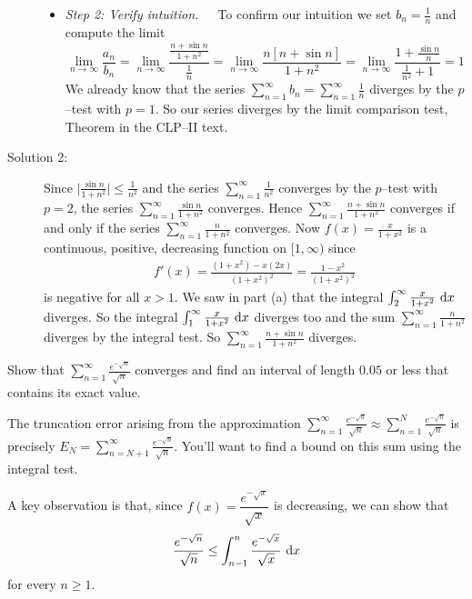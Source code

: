 \begin{solution}
\begin{description}
\begin{itemize}
\item \emph{Step 2: Verify intuition.}\ \ \
To confirm our intuition we set $b_n=\frac{1}{n}$ and
compute the limit
\begin{equation*}
\lim_{n\rightarrow\infty}\frac{a_n}{b_n}
=\lim_{n\rightarrow\infty}\frac{ \frac{n+\sin n}{1+n^2} } {\frac{1}{n}}
=\lim_{n\rightarrow\infty}\frac{n[n+\sin n]} {1+n^2}
=\lim_{n\rightarrow\infty}\frac{1+\frac{\sin n}{n}} {\frac{1}{n^2}+1}
=1
\end{equation*}
We already know that the series $\sum\limits_{n=1}^\infty b_n
=\sum\limits_{n=1}^\infty\frac{1}{n}$ diverges by the $p$--test with $p=1$.
So our series diverges by the limit comparison test,
Theorem  in the CLP--II text.
\end{itemize}


\item[Solution 2:]
Since $\big|\frac{\sin n}{1+n^2}\big|\le\frac{1}{n^2}$ and the
series $\sum\limits_{n=1}^\infty \frac{1}{n^2}$ converges by the $p$--test with $p=2$,
the series $\sum\limits_{n=1}^\infty \frac{\sin n}{1+n^2}$ converges. Hence
$\sum\limits_{n=1}^\infty \frac{n+\sin n}{1+n^2}$ converges if and only if
the series $\sum\limits_{n=1}^\infty \frac{n}{1+n^2}$ converges. Now
$f(x)=\frac{x}{1+x^2}$ is a continuous, positive, decreasing function
on $[1,\infty)$ since
\begin{align*}
f'(x)=\frac{(1+x^2)-x(2x)}{{(1+x^2)}^2}
=\frac{1-x^2}{{(1+x^2)}^2}
\end{align*}
is negative for all $x>1$. We saw in part (a) that the integral
$\int_2^\infty\frac{x}{1+x^2}\ \mathrm{d}x$ diverges. So the integral
$\int_1^\infty\frac{x}{1+x^2}\ \mathrm{d}x$ diverges too and the sum
$\sum\limits_{n=1}^\infty \frac{n}{1+n^2}$ diverges by the integral test.
So $\sum\limits_{n=1}^\infty \frac{n+\sin n}{1+n^2}$ diverges.
\end{description}
\end{solution}

\begin{question}[M121 1999A]
Show that $\displaystyle\sum\limits_{n=1}^\infty\frac{e^{-\sqrt{n}}}{\sqrt{n}}$
converges and find an interval of length $0.05$ or less that contains its
exact value.
\end{question}

\begin{hint}
The truncation error arising from the approximation $\displaystyle\sum_{n=1}^\infty \frac{e^{-\sqrt{n}}}{\sqrt n} \approx \sum_{n=1}^N \frac{e^{-\sqrt{n}}}{\sqrt n}$ is precisely
$E_N = \displaystyle\sum_{n=N+1}^\infty \frac{e^{-\sqrt{n}}}{\sqrt n}$. You'll want to find a bound on this sum using the integral test.

A key observation is that, since $f(x) = \dfrac{e^{-\sqrt{x}}}{\sqrt{x}}$ is decreasing, we can show that
\[ \frac{e^{-\sqrt{n}}}{\sqrt{n}} \leq \int_{n-1}^n \frac{e^{-\sqrt{x}}}{\sqrt{x}}\ \mathrm{d}x\] for every $n \ge 1$.
\end{hint}

